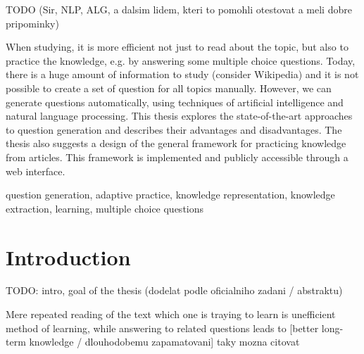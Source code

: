 \documentclass[a4paper, 12pt, twoside]{fithesis2}		%
\renewcommand{\_}{\leavevmode \kern0.07em\vbox{\hrule width0.4em}}
\newcounter{choice}
\begin{document}
\FrontMatter
\ThesisTitlePage

\begin{ThesisDeclaration}
\DeclarationText
\AdvisorName
\end{ThesisDeclaration}

\begin{ThesisThanks}
  TODO (Sir, NLP, ALG, a dalsim lidem, kteri to pomohli otestovat a meli dobre pripominky)
\end{ThesisThanks}

\begin{ThesisAbstract}
When studying, it is more efficient not just to read about the topic, but also to practice the knowledge, e.g. by answering some multiple choice questions. Today, there is a huge amount of information to study (consider Wikipedia) and it is not possible to create a set of question for all topics manually. However, we can generate questions automatically, using techniques of artificial intelligence and natural language processing. This thesis explores the state-of-the-art approaches to question generation and describes their advantages and disadvantages. The thesis also suggests a design of the general framework for practicing knowledge from articles. This framework is implemented and publicly accessible through a web interface.
\end{ThesisAbstract}

\begin{ThesisKeyWords}
question generation, adaptive practice,
knowledge representation, knowledge extraction,
learning,
multiple choice questions
\end{ThesisKeyWords}

\MainMatter
\tableofcontents

\chapter{Introduction}
\label{chap:intro}

TODO: intro, goal of the thesis (dodelat podle oficialniho zadani / abstraktu)

Mere repeated reading of the text which one is traying to learn is unefficient method of learning, while answering to related questions leads to [better long-term knowledge / dlouhodobemu zapamatovani] \parencite{edu-improve} taky mozna citovat \cite{adaptive-practice}
\end{document}
